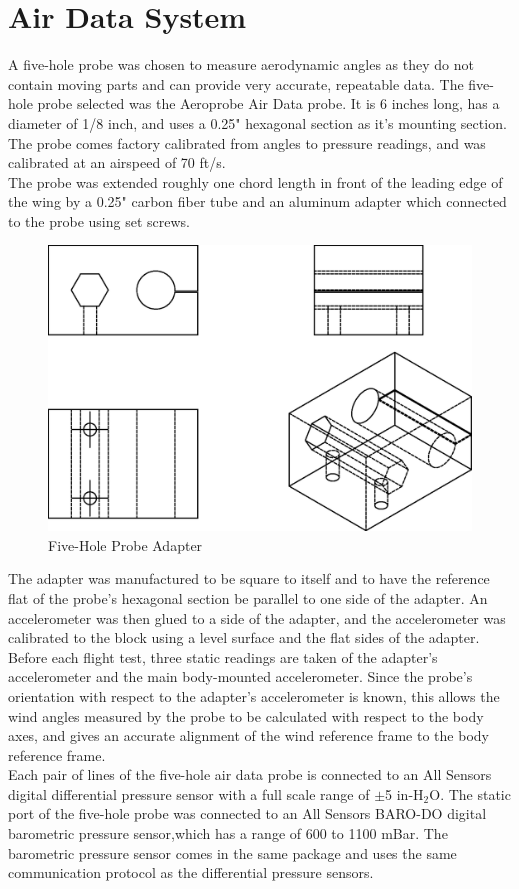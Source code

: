\section{Air Data System}
A five-hole probe was chosen to measure aerodynamic angles as they do not contain moving parts and can provide very accurate, repeatable data. The five-hole probe selected was the Aeroprobe Air Data probe. It is 6 inches long, has a diameter of 1/8 inch, and uses a 0.25" hexagonal section as it's mounting section. The probe comes factory calibrated from angles to pressure readings, and was calibrated at an airspeed of 70 ft/s.\\
The probe was extended roughly one chord length in front of the leading edge of the wing by a 0.25" carbon fiber tube and an aluminum adapter which connected to the probe using set screws.
\begin{figure}[H]

  \centering
    \includegraphics[width=.5\textwidth]{figures/probeAdapter.eps}
      \caption{Five-Hole Probe Adapter} \label{fig:probeAdapter}
\end{figure}
The adapter was manufactured to be square to itself and to have the reference flat of the probe's hexagonal section be parallel to one side of the adapter. An accelerometer was then glued to a side of the adapter, and the accelerometer was calibrated to the block using a level surface and the flat sides of the adapter. Before each flight test, three static readings are taken of the adapter's accelerometer and the main body-mounted accelerometer. Since the probe's orientation with respect to the adapter's accelerometer is known, this allows the wind angles measured by the probe to be calculated with respect to the body axes, and gives an accurate alignment of the wind reference frame to the body reference frame.\\

 Each pair of lines of the five-hole air data probe is connected to an All Sensors digital differential pressure sensor with a full scale range of $\pm$5 in-H$_2$O\cite{allsensorsDDO}. The static port of the five-hole probe was connected to an All Sensors BARO-DO digital barometric pressure sensor,which has a range of 600 to 1100 mBar\cite{allSensorsBaroDatasheet}. The barometric pressure sensor comes in the same package and uses the same communication protocol as the differential pressure sensors.

